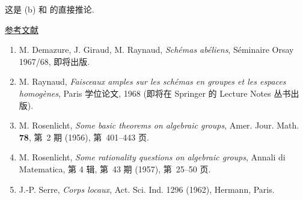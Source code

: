 这是 (b) 和  的直接推论.

\bigskip
\noindent\underline{参考文献}

\begin{enumerate}
\item[{[1]}] M. Demazure, J. Giraud, M. Raynaud,
  \emph{Sch\'emas ab\'eliens}, S\'eminaire Orsay 1967/68, 即将出版.
\item[{[2]}] M. Raynaud, \emph{Faisceaux amples sur les sch\'emas en groupes
  et les espaces homog\`enes}, Paris 学位论文, 1968 (即将在 Springer 的 Lecture
  Notes 丛书出版).
\item[{[3]}] M. Rosenlicht, \emph{Some basic theorems on algebraic groups},
  Amer. Jour. Math. \textbf{78}, 第~2 期 (1956), 第~401--443 页.
\item[{[3bis]}] M. Rosenlicht, \emph{Some rationality questions on algebraic
  groups}, Annali di Matematica, 第 4 辑, 第~43 期 (1957), 第~25--50 页.
\item[{[4]}] J.-P. Serre, \emph{Corps locaux}, Act. Sci. Ind. 1296 (1962),
  Hermann, Paris.
\end{enumerate}

